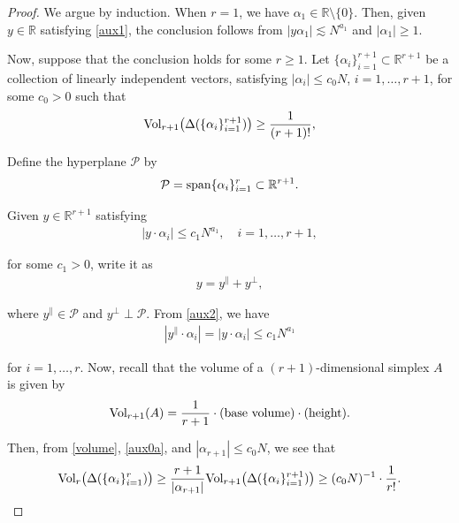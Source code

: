 \documentclass[%
11pt,  reqno]{amsart}
\newcommand{\1}{\hspace{0.2mm}\text{I}\hspace{0.2mm}}
\newcommand{\noi}{\noindent}
\newcommand{\R}{\mathbb{R}}
\newcommand{\al}{\alpha}
\newcommand{\Dl}{\Delta}
\newcommand{\les}{\lesssim}
\numberwithin{equation}{section}
\numberwithin{theorem}{section}
\begin{document}
\begin{proof}
We argue by induction.
When $r = 1$, we have  $\al_1 \in \R\setminus\{0\}$.
Then, 
given $y \in\R$ satisfying \eqref{aux1}, 
the conclusion follows from $|y \al_1| \les N^{a_1}$ and $|\al_1| \ge 1$.

Now, suppose that the conclusion holds for some $r \ge 1$.
 Let $\{\al_i \}_{i=1}^{r+1} \subset \R^{r+1}$ be a collection of linearly independent  vectors, 
  satisfying 
$ |\al_i| \le c_0  N$, $i = 1, \dots, r+1$, 
for some $c_0 > 0$
such that 
\begin{align}
\textup{Vol}_{r+1}
\big(\Dl(\{\al_i\}_{i = 1}^{r+1})\big) \ge \frac 1{(r+1)!}, 
\label{aux0a}
\end{align}


 
\noi
Define the hyperplane $\mathcal{P}$ by 
\[
\mathcal P = {\rm span} \{\al_i \}_{i=1}^r \subset \R^{r+1}.
\]

\noi
Given  $y \in \R^{r+1}$ satisfying
\begin{align}
|y \cdot \al_i| \le c_1 N^{a_1}, \quad i = 1, \dots, r+1, 
\label{aux2}
\end{align}

\noi
for some $c_1 > 0$, 
write it as 
\begin{align*}
y = y^\parallel + y^\perp,
\end{align*}



\noi
where $y^\parallel \in \mathcal P$ and $ y^\perp \perp \mathcal P$.
From \eqref{aux2}, we have
\begin{align}
|y^\parallel \cdot \al_i | = |y \cdot \al_i | \le c_1 N^{a_1}
\label{aux0b}
\end{align}



\noi
for $i = 1, \dots, r$.
Now, 
 recall that the volume of a $(r+1)$-dimensional simplex $A$ is given by 
\begin{align}\label{volume}
\textup{Vol}_{r+1}(A)
= 
 \frac1{r+1} \cdot (\textup{base volume}) \cdot (\textup{height}).
\end{align}


\noi
Then, 
from \eqref{volume}, \eqref{aux0a},  and $|\al_{r+1}|\le c_0 N$, we see that 
\begin{align*}
\textup{Vol}_r
\big(\Dl(\{\al_i\}_{i = 1}^r)\big) \ge 
\frac{r+1}{|\al_{r+1}|}
\textup{Vol}_{r+1}
\big(\Dl(\{\al_i\}_{i = 1}^{r+1})\big) \ge (c_0N)^{-1}\cdot \frac 1 {r!}.
\end{align*}



\end{proof}
\end{document}
